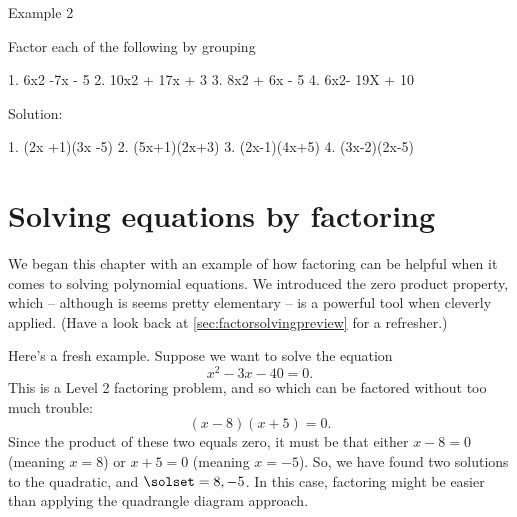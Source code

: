Example 2

Factor each of the following by grouping

1. 6x2 -7x - 5
2. 10x2 + 17x + 3
3. 8x2 + 6x - 5
4. 6x2- 19X + 10

Solution:

1. (2x +1)(3x -5)
2. (5x+1)(2x+3)
3. (2x-1)(4x+5)
4. (3x-2)(2x-5)

%
%
%
%
%
%
%
%

\section{Solving equations by factoring}

We began this chapter with an example of how factoring can be helpful when it comes to solving polynomial equations. We introduced the zero product property, which -- although is seems pretty elementary -- is a powerful tool when cleverly applied. (Have a look back at \cref{sec:factorsolvingpreview} for a refresher.)

Here's a fresh example. Suppose we want to solve the equation
\[x^2 - 3x - 40 = 0.\]
This is a Level 2 factoring problem, and so which can be factored without too much trouble:
\[(x-8)(x+5) = 0.\]
Since the product of these two equals zero, it must be that either $x-8=0$ (meaning $x=8$) or $x+5=0$ (meaning $x=-5$). So, we have found two solutions to the quadratic, and $\solset={8, -5}$. In this case, factoring might be easier than applying the quadrangle diagram approach.


